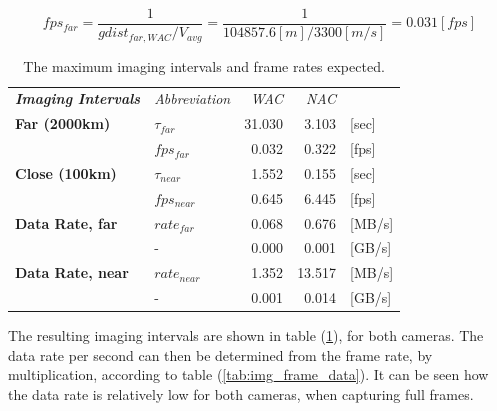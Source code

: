 \begin{equation}\label{eq:imaging_rate_calc}
fps_{far} = \frac{1}{gdist_{far,WAC}/V_{avg}} = \frac{1}{104857.6[m]/3300[m/s]} = 0.031 [fps]
\end{equation}
\begin{table}[h!]
  \centering
\begin{tabular}{l|l|r|r|l}
\textit{\textbf{Imaging Intervals}} & \textit{Abbreviation} & \multicolumn{1}{r}{\textit{WAC}} & \multicolumn{1}{r}{\textit{NAC}} &  \bigstrut[b]\\
\cline{1-4}\textbf{Far (2000km)} & $\tau_{far}$ & 31.030 & 3.103 & [sec] \bigstrut[t]\\
      & $fps_{far}$ & 0.032 & 0.322 & [fps] \bigstrut[b]\\
\cline{1-4}\textbf{Close (100km)} & $\tau_{near}$ & 1.552 & 0.155 & [sec] \bigstrut[t]\\
      & $fps_{near}$ & 0.645 & 6.445 & [fps] \bigstrut[b]\\
\cline{1-4}\textbf{Data Rate, far} & $rate_{far}$ & 0.068 & 0.676 & [MB/s] \bigstrut[t]\\
\textbf{} & -     & 0.000 & 0.001 & [GB/s] \bigstrut[b]\\
\cline{2-4}\textbf{Data Rate, near} & $rate_{near}$ & 1.352 & 13.517 & [MB/s] \bigstrut[t]\\
\textbf{} & -     & 0.001 & 0.014 & [GB/s] \\
\end{tabular}%
      \caption{The maximum imaging intervals and frame rates expected.}
  \label{tab:imaging_interval}%
\end{table}%
The resulting imaging intervals are shown in table (\ref{tab:imaging_interval}), for both cameras. The data rate per second can then be determined from the frame rate, by multiplication, according to table (\ref{tab:img_frame_data}). It can be seen how the data rate is relatively low for both cameras, when capturing full frames.

